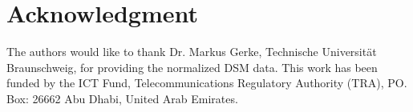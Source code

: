 \documentclass[journal]{IEEEtran}
\begin{document}
\section*{Acknowledgment}

The authors would like to thank Dr. Markus Gerke, Technische Universität Braunschweig, for providing the normalized DSM data. This work has been funded by the ICT Fund, Telecommunications Regulatory Authority (TRA), PO. Box: 26662 Abu Dhabi, United Arab Emirates.












\end{document}
